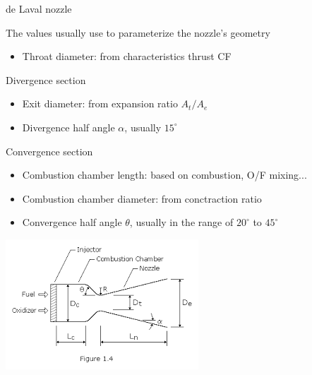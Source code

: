\documentclass{beamer}
\begin{document}
\begin{frame}[t]{de Laval nozzle}
\begin{minipage}[t]{0.45\textwidth}
\begin{figure}[t]
        \end{figure}
    \end{minipage}
    
\end{frame}

\begin{frame}
    The values usually use to parameterize the nozzle's geometry
    \begin{itemize}
        \item Throat diameter: from characteristics thrust CF
    \end{itemize}
    Divergence section
    \begin{itemize}
        \item Exit diameter: from expansion ratio $A_t / A_e$
        \item Divergence half angle $\alpha$, usually $15^{\circ}$
    \end{itemize}
    Convergence section
    \begin{itemize}
        \item Combustion chamber length: based on combustion, O/F mixing...
        \item Combustion chamber diameter: from conctraction ratio
        \item Convergence half angle $\theta$, usually in the range of $20^{\circ}$ to $45^{\circ}$
    \end{itemize}
    \centering  \includegraphics[height=0.45\textheight]{images/combustion_chamber_parameters.png}
\end{frame}
\end{document}
